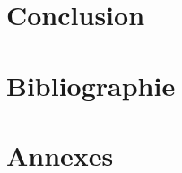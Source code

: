 \documentclass[a4paper, 12pt, french]{article}
\begin{document}
\newpage
\part{Conclusion}


\newpage
\part*{Bibliographie}



\newpage
\part*{Annexes}

\end{document}
